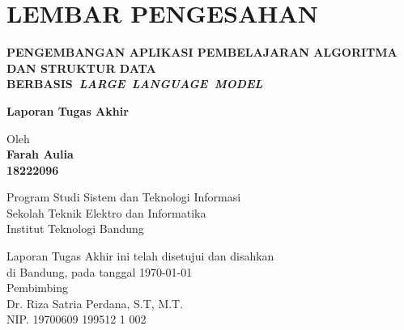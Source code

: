 \chapter*{LEMBAR PENGESAHAN}


\begin{center}
    \vspace{0.5cm}
  {\Large\bfseries PENGEMBANGAN APLIKASI PEMBELAJARAN ALGORITMA DAN STRUKTUR DATA \mbox{BERBASIS \textit{LARGE LANGUAGE MODEL}}}\\
  \vspace{2.5cm}

  {\Large \textbf{Laporan Tugas Akhir}}\\


  \vspace{1cm}
    
    
  {\large Oleh}\\[0.3cm]
    \textbf{
    {\large Farah Aulia}\\
    {\large 18222096}
  }\\
    
  \vspace{0.5cm}
 
  {\large Program Studi Sistem dan Teknologi Informasi}\\
  {\large Sekolah Teknik Elektro dan Informatika}\\
  {\large Institut Teknologi Bandung}\\

  \vspace{1cm}

  Laporan Tugas Akhir ini telah disetujui dan disahkan\\ 
  di Bandung, pada tanggal \today\\[1cm]

	Pembimbing  \\[2cm]
	Dr. Riza Satria Perdana, S.T, M.T.  \\[0.2cm]
	NIP. 19700609 199512 1 002 

\end{center}

\vspace{1cm}
\noindent


